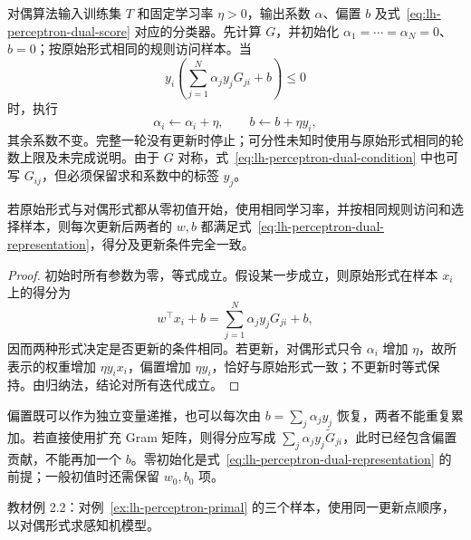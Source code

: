 对偶算法输入训练集 $T$ 和固定学习率 $\eta>0$，输出系数 $\alpha$、偏置 $b$ 及式~\eqref{eq:lh-perceptron-dual-score} 对应的分类器。先计算 $G$，并初始化 $\alpha_1=\cdots=\alpha_N=0$、$b=0$；按原始形式相同的规则访问样本。当
\begin{equation}
\label{eq:lh-perceptron-dual-condition}
y_i\left(\sum_{j=1}^{N}\alpha_jy_jG_{ji}+b\right)\leq0
\end{equation}
时，执行
\begin{equation}
\label{eq:lh-perceptron-dual-update}
\alpha_i\leftarrow\alpha_i+\eta,
\qquad
b\leftarrow b+\eta y_i,
\end{equation}
其余系数不变。完整一轮没有更新时停止；可分性未知时使用与原始形式相同的轮数上限及未完成说明。由于 $G$ 对称，式~\eqref{eq:lh-perceptron-dual-condition} 中也可写 $G_{ij}$，但必须保留求和系数中的标签 $y_j$。

\begin{proposition}[两种形式的逐步等价性]
\label{prop:lh-perceptron-primal-dual}
若原始形式与对偶形式都从零初值开始，使用相同学习率，并按相同规则访问和选择样本，则每次更新后两者的 $w,b$ 都满足式~\eqref{eq:lh-perceptron-dual-representation}，得分及更新条件完全一致。
\end{proposition}

\begin{proof}
初始时所有参数为零，等式成立。假设某一步成立，则原始形式在样本 $x_i$ 上的得分为
\[
w^\top x_i+b
=\sum_{j=1}^{N}\alpha_jy_jG_{ji}+b,
\]
因而两种形式决定是否更新的条件相同。若更新，对偶形式只令 $\alpha_i$ 增加 $\eta$，故所表示的权重增加 $\eta y_i x_i$，偏置增加 $\eta y_i$，恰好与原始形式一致；不更新时等式保持。由归纳法，结论对所有迭代成立。
\end{proof}

偏置既可以作为独立变量递推，也可以每次由 $b=\sum_j\alpha_jy_j$ 恢复，两者不能重复累加。若直接使用扩充 Gram 矩阵，则得分应写成 $\sum_j\alpha_jy_j\widetilde G_{ji}$，此时已经包含偏置贡献，不能再加一个 $b$。零初始化是式~\eqref{eq:lh-perceptron-dual-representation} 的前提；一般初值时还需保留 $w_0,b_0$ 项。

\begin{example}
\label{ex:lh-perceptron-dual}
教材例 2.2：对例~\ref{ex:lh-perceptron-primal} 的三个样本，使用同一更新点顺序，以对偶形式求感知机模型。
\end{example}

